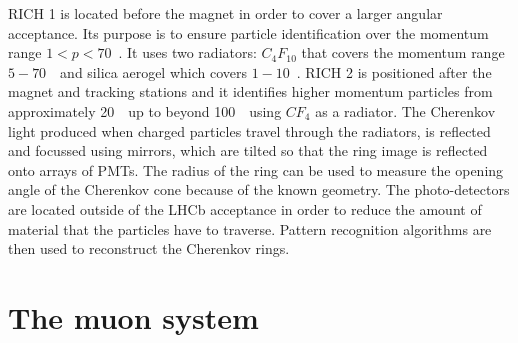 RICH 1 is located before the magnet in order to cover a larger angular acceptance. Its purpose is to ensure
particle identification over the momentum range \mbox{$1 < p < 70$~\gevc}. It uses two radiators: $C_4F_{10}$ that covers
the momentum range $5-70$~\gevc~and silica aerogel which covers $1-10$~\gevc. RICH 2 is positioned after
the magnet and tracking stations and it identifies higher momentum particles from approximately 20~\gevc~up to beyond
100~\gevc~using $CF_4$ as a radiator.
The Cherenkov light produced when charged particles travel through the radiators, is reflected and focussed using
mirrors, which are tilted so that the ring image is reflected onto arrays of PMTs.
The radius of the ring can be used to measure the opening angle of the Cherenkov cone because of the known geometry.
The photo-detectors are located outside of the LHCb acceptance in order to reduce the amount of material that
the particles have to traverse. Pattern recognition algorithms are then used to reconstruct the Cherenkov rings.



\section{The muon system}

